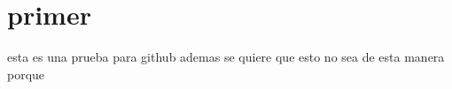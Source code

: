 \documentclass[a4paper,12pt]{article}
\begin{document}
\section{primer}
esta es una prueba para github ademas se quiere que esto no sea de esta manera porque 
\end{document}
